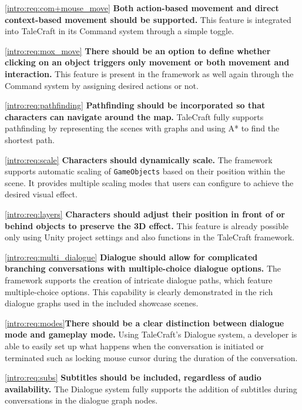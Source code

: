 \ref{intro:req:com+mouse_move} \quad  \textbf{Both action-based movement and direct context-based movement should be supported.} This feature is integrated into TaleCraft in its Command system through a simple toggle.

\ref{intro:req:mox_move} \quad  \textbf{There should be an option to define whether clicking on an object triggers only movement or both movement and interaction.} This feature is present in the framework as well again through the Command system by assigning desired actions or not.

\ref{intro:req:pathfinding} \quad  \textbf{Pathfinding should be incorporated so that characters can navigate around the map.} TaleCraft fully supports pathfinding by representing the scenes with graphs and using A* to find the shortest path.

\ref{intro:req:scale} \quad  \textbf{Characters should dynamically scale.} The framework supports automatic scaling of \verb|GameObjects| based on their position within the scene. It provides multiple scaling modes that users can configure to achieve the desired visual effect.
 
\ref{intro:req:layers} \quad  \textbf{Characters should adjust their position in front of or behind objects to preserve the 3D effect.} This feature is already possible only using Unity project settings and also functions in the TaleCraft framework.

\ref{intro:req:multi_dialogue} \quad  \textbf{Dialogue should allow for complicated branching conversations with multiple-choice dialogue options.} The framework supports the creation of intricate dialogue paths, which feature multiple-choice options. This capability is clearly demonstrated in the rich dialogue graphs used in the included showcase scenes. 

\ref{intro:req:modes}\quad  \textbf{There should be a clear distinction between dialogue mode and gameplay mode.} Using TaleCraft's Dialogue system, a developer is able to easily set up what happens when the conversation is initiated or terminated such as locking mouse cursor during the duration of the conversation.

\ref{intro:req:subs} \quad  \textbf{Subtitles should be included, regardless of audio availability.} The Dialogue system fully supports the addition of subtitles during conversations in the dialogue graph nodes.


